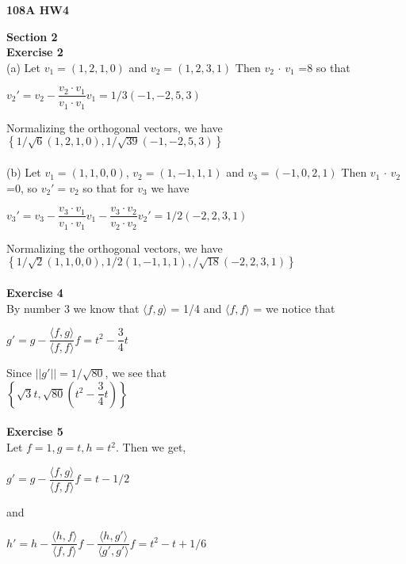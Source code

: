 \documentclass[12pt]{amsart}
\begin{document}
\begin{center}
{\bf 108A HW4 }\\
\end{center}
\textbf{Section 2} \\
\textbf{Exercise 2}\\
(a) Let $v_1=(1,2,1,0)$ and $v_2=(1,2,3,1)$ Then $v_2$ $\cdot$ $v_1$ =8 so that\\
\begin{center}
$v_2' = v_2 - \dfrac{v_2 \cdot v_1}{v_1 \cdot v_1}v_1 = 1/3(-1,-2,5,3)$
\end{center}
Normalizing the orthogonal vectors, we have 
$\left\{{1/\sqrt{6}(1,2,1,0), 1/\sqrt{39}(-1,-2,5,3)}\right\}$\\
\\
(b) Let $v_1=(1,1,0,0)$, $v_2=(1,-1,1,1)$ and $v_3=(-1,0,2,1)$ Then $v_1$ $\cdot$ $v_2$ =0, so $v_2' = v_2$ so that for $v_3$ we have\\
\begin{center}
$v_3' = v_3 - \dfrac{v_3 \cdot v_1}{v_1 \cdot v_1}v_1 - \dfrac{v_3 \cdot v_2}{v_2 \cdot v_2}v_2' = 1/2(-2,2,3,1)$
\end{center}
Normalizing the orthogonal vectors, we have 
$\left\{{1/\sqrt{2}(1,1,0,0), 1/2(1,-1,1,1), /\sqrt{18}(-2,2,3,1)}\right\}$\\
 \\
\textbf{Exercise 4}\\
By number 3 we know that $\langle f,g \rangle$ = 1/4 and $ \langle f,f \rangle$ = we notice that\\
\begin{center}
$g' = g - \dfrac{\langle f,g \rangle}{\langle f,f \rangle}f = t^2 - \dfrac{3}{4}t$
\end{center}
Since $||g'|| = 1/\sqrt{80}$, we see that\\
$\left\{{\sqrt{3}t, \sqrt{80}(t^2-\dfrac{3}{4}t)}\right\}$\\
\\
\textbf{Exercise 5}\\
Let $f=1, g =t, h=t^2$. Then we get,\\
\begin{center}
$g' = g - \dfrac{\langle f,g \rangle}{\langle f,f \rangle}f = t - 1/2$
\end{center}
and\\
\begin{center}
$h' = h - \dfrac{\langle h,f \rangle}{\langle f,f \rangle}f - \dfrac{\langle h,g' \rangle}{\langle g',g' \rangle}f = t^2 - t + 1/6$
\end{center}
\end{document}

